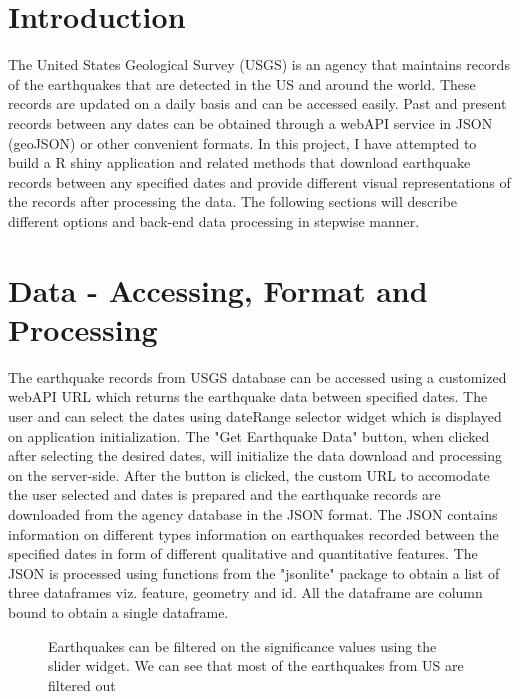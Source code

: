 \documentclass{article}
\begin{document}
	\section{Introduction}
		The United States Geological Survey (USGS) is an agency that maintains records of the earthquakes that are detected in the US and around the world. These records are updated on a daily basis and can be accessed easily. Past and present records between any dates can be obtained through a webAPI service in JSON (geoJSON) or other convenient formats. In this project, I have attempted to build a R shiny application and related methods that download earthquake records between any specified dates and provide different visual representations of the records after processing the data. The following sections will describe different options and back-end data processing in stepwise manner.
	
	\section{Data - Accessing, Format and Processing}
		
		The earthquake records from USGS database can be accessed using a customized webAPI URL which returns the earthquake data between specified dates. The user and can select the dates using dateRange selector widget which is displayed on application initialization. The "Get Earthquake Data" button, when clicked after selecting the desired dates, will initialize the data download and processing on the server-side. After the button is clicked, the custom URL to accomodate the user selected and dates is prepared and the earthquake records are downloaded from the agency database in the JSON format. The JSON contains information on different types information on earthquakes recorded between the specified dates in form of different qualitative and quantitative features. The JSON is processed using functions from the "jsonlite" package to obtain a list of three dataframes viz. feature, geometry and id. All the dataframe are column bound to obtain a single dataframe.
		
		\begin{figure}
			\caption{Earthquakes can be filtered on the significance values using the slider widget. We can see that most of the earthquakes from US are filtered out}
		\end{figure}
		
\end{document}

